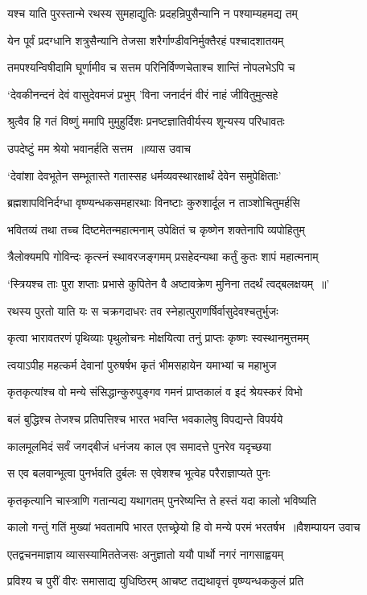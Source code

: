 \twolineshloka
{यश्च याति पुरस्तान्मे रथस्य सुमहाद्युतिः}
{प्रदहन्रिपुसैन्यानि न पश्याम्यहमद्य तम्}


\twolineshloka
{येन पूर्वं प्रदग्धानि शत्रुसैन्यानि तेजसा}
{शरैर्गाण्डीवनिर्मुक्तैरहं पश्चादशातयम्}


\twolineshloka
{तमपश्यन्विषीदामि घूर्णामीव च सत्तम}
{परिनिर्विण्णचेताश्च शान्तिं नोपलभेऽपि च}


\twolineshloka
{`देवकीनन्दनं देवं वासुदेवमजं प्रभुम्}
{'विना जनार्दनं वीरं नाहं जीवितुमुत्सहे}


\twolineshloka
{श्रुत्वैव हि गतं विष्णुं ममापि मुमुहुर्दिशः}
{प्रनष्टज्ञातिवीर्यस्य शून्यस्य परिधावतः}


\twolineshloka
{उपदेष्टुं मम श्रेयो भवानर्हति सत्तम ॥व्यास उवाच}
{}


\twolineshloka
{`देवांशा देवभूतेन सम्भूतास्ते गतास्सह}
{धर्मव्यवस्थारक्षार्थं देवेन समुपेक्षिताः'}


\twolineshloka
{ब्रह्मशापविनिर्दग्धा वृष्ण्यन्धकसमहारथाः}
{विनष्टाः कुरुशार्दूल न ताञ्शोचितुमर्हसि}


\twolineshloka
{भवितव्यं तथा तच्च दिष्टमेतन्महात्मनाम्}
{उपेक्षितं च कृष्णेन शक्तेनापि व्यपोहितुम्}


\twolineshloka
{त्रैलोक्यमपि गोविन्दः कृत्स्नं स्थावरजङ्गमम्}
{प्रसहेदन्यथा कर्तुं कुतः शापं महात्मनाम्}


\twolineshloka
{`स्त्रियश्च ताः पुरा शप्ताः प्रभासे कुपितेन वै}
{अष्टावक्रेण मुनिना तदर्थं त्वद्बलक्षयम् ॥'}


\twolineshloka
{रथस्य पुरतो याति यः स चक्रगदाधरः}
{तव स्नेहात्पुराणर्षिर्वासुदेवश्चतुर्भुजः}


\twolineshloka
{कृत्वा भारावतरणं पृथिव्याः पृथुलोचनः}
{मोक्षयित्वा तनुं प्राप्तः कृष्णः स्वस्थानमुत्तमम्}


\twolineshloka
{त्वयाऽपीह महत्कर्म देवानां पुरुषर्षभ}
{कृतं भीमसहायेन यमाभ्यां च महाभुज}


\twolineshloka
{कृतकृत्यांश्च वो मन्ये संसिद्धान्कुरुपुङ्गव}
{गमनं प्राप्तकालं व इदं श्रेयस्करं विभो}


\twolineshloka
{बलं बुद्धिश्च तेजश्च प्रतिपत्तिश्च भारत}
{भवन्ति भवकालेषु विपद्यन्ते विपर्यये}


\twolineshloka
{कालमूलमिदं सर्वं जगद्बीजं धनंजय}
{काल एव समादत्ते पुनरेव यदृच्छया}


\twolineshloka
{स एव बलवान्भूत्वा पुनर्भवति दुर्बलः}
{स एवेशश्च भूत्वेह परैराज्ञाप्यते पुनः}


\twolineshloka
{कृतकृत्यानि चास्त्राणि गतान्यद्य यथागतम्}
{पुनरेष्यन्ति ते हस्तं यदा कालो भविष्यति}


\threelineshloka
{कालो गन्तुं गतिं मुख्यां भवतामपि भारत}
{एतच्छ्रेयो हि वो मन्ये परमं भरतर्षभ ॥वैशम्पायन उवाच}
{}


\twolineshloka
{एतद्वचनमाज्ञाय व्यासस्यामिततेजसः}
{अनुज्ञातो ययौ पार्थो नगरं नागसाह्वयम्}


\twolineshloka
{प्रविश्य च पुरीं वीरः समासाद्य युधिष्ठिरम्}
{आचष्ट तद्यथावृत्तं वृष्ण्यन्धककुलं प्रति}


